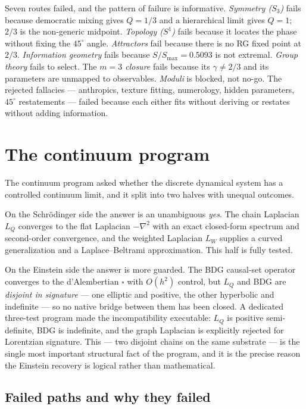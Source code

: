 \documentclass[10pt,twoside,openany]{book}
\begin{document}
Seven routes failed, and the pattern of failure is informative. \emph{Symmetry ($S_3$)}
fails because democratic mixing gives $Q=1/3$ and a hierarchical limit gives $Q=1$; $2/3$
is the non-generic midpoint. \emph{Topology ($S^1$)} fails because it locates the phase
without fixing the $45^\circ$ angle. \emph{Attractors} fail because there is no RG fixed
point at $2/3$. \emph{Information geometry} fails because $S/S_{\max}=0.5093$ is not
extremal. \emph{Group theory} fails to select. The \emph{$m=3$ closure} fails because its
$\gamma\ne2/3$ and its parameters are unmapped to observables. \emph{Moduli} is blocked,
not no-go. The rejected fallacies --- anthropics, texture fitting, numerology, hidden
parameters, $45^\circ$ restatements --- failed because each either fits without deriving
or restates without adding information.

\section{The continuum program}

The continuum program asked whether the discrete dynamical system has a controlled
continuum limit, and it split into two halves with unequal outcomes.

On the Schr\"odinger side the answer is an unambiguous \emph{yes}. The chain Laplacian
$L_Q$ converges to the flat Laplacian $-\nabla^2$ with an exact closed-form spectrum and
second-order convergence, and the weighted Laplacian $L_W$ supplies a curved
generalization and a Laplace--Beltrami approximation. This half is fully tested.

On the Einstein side the answer is more guarded. The BDG causal-set operator converges to
the d'Alembertian $\square$ with $O(h^2)$ control, but $L_Q$ and BDG are \emph{disjoint in
signature} --- one elliptic and positive, the other hyperbolic and indefinite --- so no
native bridge between them has been closed. A dedicated three-test program made the
incompatibility executable: $L_Q$ is positive semi-definite, BDG is indefinite, and the
graph Laplacian is explicitly rejected for Lorentzian signature. This --- two disjoint
chains on the same substrate --- is the single most important structural fact of the
program, and it is the precise reason the Einstein recovery is logical rather than
mathematical.

\subsection{Failed paths and why they failed}
\end{document}
